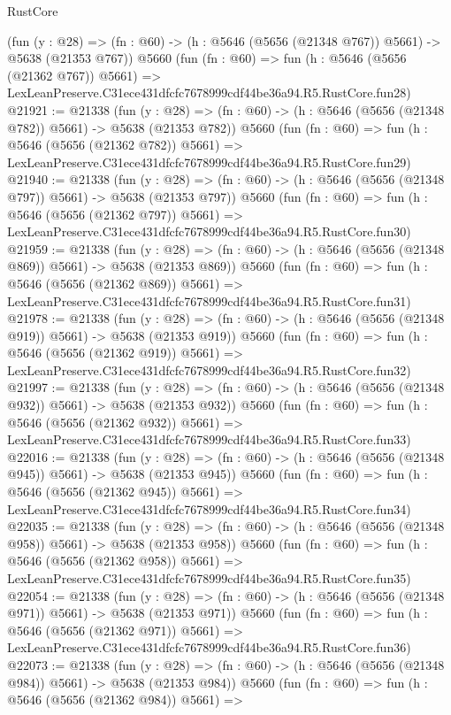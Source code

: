 \begin{lexlean}{RustCore}
\begin{coremodule}
    (fun (y : @28) => (fn : @60) -> (h : @5646 (@5656 (@21348 @767)) @5661) -> @5638 (@21353 @767))
    @5660
    (fun (fn : @60) =>
    fun (h : @5646 (@5656 (@21362 @767)) @5661) =>
    LexLeanPreserve.C31ece431dfcfc7678999cdf44be36a94.R5.RustCore.fun28)
@21921 := @21338
    (fun (y : @28) => (fn : @60) -> (h : @5646 (@5656 (@21348 @782)) @5661) -> @5638 (@21353 @782))
    @5660
    (fun (fn : @60) =>
    fun (h : @5646 (@5656 (@21362 @782)) @5661) =>
    LexLeanPreserve.C31ece431dfcfc7678999cdf44be36a94.R5.RustCore.fun29)
@21940 := @21338
    (fun (y : @28) => (fn : @60) -> (h : @5646 (@5656 (@21348 @797)) @5661) -> @5638 (@21353 @797))
    @5660
    (fun (fn : @60) =>
    fun (h : @5646 (@5656 (@21362 @797)) @5661) =>
    LexLeanPreserve.C31ece431dfcfc7678999cdf44be36a94.R5.RustCore.fun30)
@21959 := @21338
    (fun (y : @28) => (fn : @60) -> (h : @5646 (@5656 (@21348 @869)) @5661) -> @5638 (@21353 @869))
    @5660
    (fun (fn : @60) =>
    fun (h : @5646 (@5656 (@21362 @869)) @5661) =>
    LexLeanPreserve.C31ece431dfcfc7678999cdf44be36a94.R5.RustCore.fun31)
@21978 := @21338
    (fun (y : @28) => (fn : @60) -> (h : @5646 (@5656 (@21348 @919)) @5661) -> @5638 (@21353 @919))
    @5660
    (fun (fn : @60) =>
    fun (h : @5646 (@5656 (@21362 @919)) @5661) =>
    LexLeanPreserve.C31ece431dfcfc7678999cdf44be36a94.R5.RustCore.fun32)
@21997 := @21338
    (fun (y : @28) => (fn : @60) -> (h : @5646 (@5656 (@21348 @932)) @5661) -> @5638 (@21353 @932))
    @5660
    (fun (fn : @60) =>
    fun (h : @5646 (@5656 (@21362 @932)) @5661) =>
    LexLeanPreserve.C31ece431dfcfc7678999cdf44be36a94.R5.RustCore.fun33)
@22016 := @21338
    (fun (y : @28) => (fn : @60) -> (h : @5646 (@5656 (@21348 @945)) @5661) -> @5638 (@21353 @945))
    @5660
    (fun (fn : @60) =>
    fun (h : @5646 (@5656 (@21362 @945)) @5661) =>
    LexLeanPreserve.C31ece431dfcfc7678999cdf44be36a94.R5.RustCore.fun34)
@22035 := @21338
    (fun (y : @28) => (fn : @60) -> (h : @5646 (@5656 (@21348 @958)) @5661) -> @5638 (@21353 @958))
    @5660
    (fun (fn : @60) =>
    fun (h : @5646 (@5656 (@21362 @958)) @5661) =>
    LexLeanPreserve.C31ece431dfcfc7678999cdf44be36a94.R5.RustCore.fun35)
@22054 := @21338
    (fun (y : @28) => (fn : @60) -> (h : @5646 (@5656 (@21348 @971)) @5661) -> @5638 (@21353 @971))
    @5660
    (fun (fn : @60) =>
    fun (h : @5646 (@5656 (@21362 @971)) @5661) =>
    LexLeanPreserve.C31ece431dfcfc7678999cdf44be36a94.R5.RustCore.fun36)
@22073 := @21338
    (fun (y : @28) => (fn : @60) -> (h : @5646 (@5656 (@21348 @984)) @5661) -> @5638 (@21353 @984))
    @5660
    (fun (fn : @60) =>
    fun (h : @5646 (@5656 (@21362 @984)) @5661) =>

\end{coremodule}
\end{lexlean}
